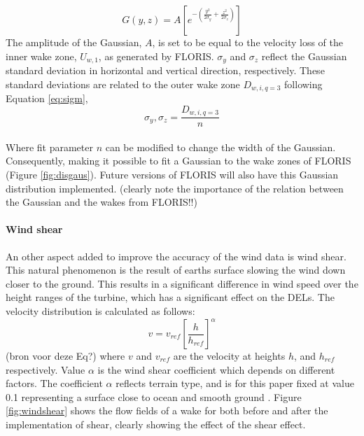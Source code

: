 \begin{equation}
\label{eq:gaus}
G(y, z) = A [e^{-(\frac{y^2}{2\sigma_y} + \frac{z^2}{2\sigma_z})}]
\end{equation}
The amplitude of the Gaussian, $A$, is set to be equal to the velocity loss of the inner wake zone, $U_{w,1}$, as generated by FLORIS. $\sigma_y$ and $\sigma_z$ reflect the Gaussian standard deviation in horizontal and vertical direction, respectively. These standard deviations are related to the outer wake zone $D_{w,i,q=3}$ following Equation \ref{eq:sigm},
\begin{equation}
\label{eq:sigm}
\sigma_y,\sigma_z = \frac{D_{w,i,q=3}}{n} 
\end{equation}
\\
Where fit parameter $n$ can be modified to change the width of the Gaussian. Consequently, making it possible to fit a Gaussian to the wake zones of FLORIS (Figure \ref{fig:disgaus}). Future versions of FLORIS will also have this Gaussian distribution implemented. (clearly note the importance of the relation between the Gaussian and the wakes from FLORIS!!) 

\paragraph{Wind shear} \label{sec:windshear}
An other aspect added to improve the accuracy of the wind data is wind shear. This natural phenomenon is the result of earths surface slowing the wind down closer to the ground. This results in a significant difference in wind speed over the height ranges of the turbine, which has a significant effect on the DELs\cite{Firtin2011}.  The velocity distribution is calculated as follows: 
\begin{equation}
\label{eq:shear}
v = v_{ref} \left[\frac{h}{h_{ref}}\right]^\alpha
\end{equation}
(bron voor deze Eq?)
where $v$ and $v_{ref}$ are the velocity at heights $h$, and $h_{ref}$  respectively. Value $\alpha$ is the wind shear coefficient which depends on different factors. The coefficient $\alpha$  reflects terrain type, and is for this paper fixed at value 0.1 representing a surface close to ocean and smooth ground \cite{Firtin2011}. Figure \ref{fig:windshear} shows the flow fields of a wake for both before and after the implementation of shear, clearly showing the effect of the shear effect.

